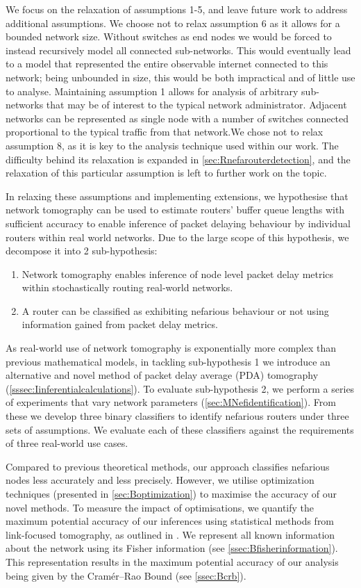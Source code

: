 We focus on the relaxation of assumptions 1-5, and leave future work to address additional assumptions. We choose not to relax assumption 6 as it allows for a bounded network size. Without switches as end nodes we would be forced to instead recursively model all connected sub-networks. This would eventually lead to a model that represented the entire observable internet connected to this network; being unbounded in size, this would be both impractical and of little use to analyse. Maintaining assumption 1 allows for analysis of arbitrary sub-networks that may be of interest to the typical network administrator. Adjacent networks can be represented as single node with a number of switches connected proportional to the typical traffic from that network.We chose not to relax assumption 8, as it is key to the analysis technique used within our work. The difficulty behind its relaxation is expanded in \cref{sec:Rnefarouterdetection}, and the relaxation of this particular assumption is left to further work on the topic.\par
In relaxing these assumptions and implementing extensions, we hypothesise that network tomography can be used to estimate routers' buffer queue lengths with sufficient accuracy to enable inference of packet delaying behaviour by individual routers within real world networks. Due to the large scope of this hypothesis, we decompose it into 2 sub-hypothesis:
\begin{enumerate}
    \item Network tomography enables inference of node level packet delay metrics within stochastically routing real-world networks.
    \item A router can be classified as exhibiting nefarious behaviour or not using information gained from packet delay metrics.
\end{enumerate}
As real-world use of network tomography is exponentially more complex than previous mathematical models, in tackling sub-hypothesis 1 we introduce an alternative and novel method of packet delay average (PDA) tomography (\cref{sssec:Iinferentialcalculations}). To evaluate sub-hypothesis 2, we perform a series of experiments that vary network parameters (\cref{sec:MNefidentification}). From these we develop three binary classifiers to identify nefarious routers under three sets of assumptions. We evaluate each of these classifiers against the requirements of three real-world use cases.\par
Compared to previous theoretical methods, our approach classifies nefarious nodes less accurately and less precisely. However, we utilise optimization techniques (presented in \cref{sec:Boptimization}) to maximise the accuracy of our novel methods. To measure the impact of optimisations, we quantify the maximum potential accuracy of our inferences using statistical methods from link-focused tomography, as outlined in \cite{he_fisher_2015}. We represent all known information about the network using its Fisher information (see \cref{ssec:Bfisherinformation}). This representation results in the maximum potential accuracy of our analysis being given by the Cramér–Rao Bound (see \cref{ssec:Bcrb}).\par
